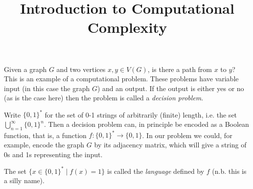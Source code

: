 \documentclass{report}
\theoremstyle{definition}
\theoremstyle{plain}
\theoremstyle{definition}
\begin{document}
	\title{Introduction to Computational Complexity}
	\maketitle
	Given a graph $G$ and two vertices $x,y\in V(G)$, is there a path from $x$ to $y$? This is an example of a computational problem. These problems have variable input (in this case the graph $G$) and an output. If the output is either yes or no (as is the case here) then the problem is called a \emph{decision problem}.
	
	Write $\{0,1\}^*$ for the set of 0-1 strings of arbitrarily (finite) length, i.e. the set $\bigcup_{n=1}^\infty\{0,1\}^n$. Then a decision problem can, in principle be encoded as a Boolean function, that is, a function $f\colon \{0,1\}^*\to \{0,1\}$. In our problem we could, for example, encode the graph $G$ by its adjacency matrix, which will give a string of 0s and 1s representing the input.
	
	The set $\{x\in \{0,1\}^* \mid f(x) = 1\}$ is called the \emph{language} defined by $f$ (n.b. this is a silly name).
	
\end{document}
